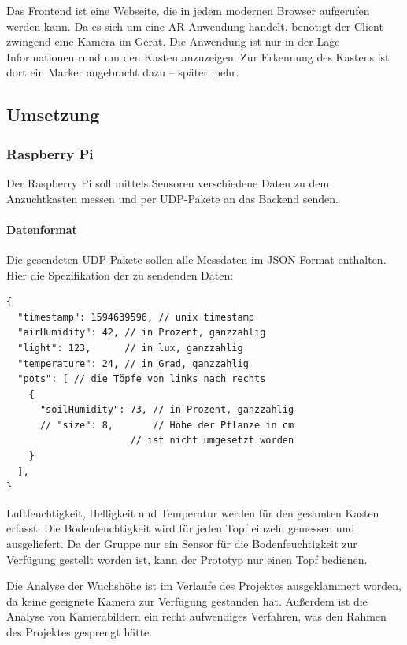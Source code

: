 Das Frontend ist eine Webseite, die in jedem modernen Browser aufgerufen
werden kann. Da es sich um eine AR-Anwendung handelt, benötigt der
Client zwingend eine Kamera im Gerät. Die Anwendung ist nur in der Lage
Informationen rund um den Kasten anzuzeigen. Zur Erkennung des Kastens
ist dort ein Marker angebracht dazu -- später mehr.

\hypertarget{umsetzung}{%
\subsection{Umsetzung}\label{umsetzung}}

\hypertarget{raspberry-pi}{%
\subsubsection{Raspberry Pi}\label{raspberry-pi}}

Der Raspberry Pi soll mittels Sensoren verschiedene Daten zu dem
Anzuchtkasten messen und per UDP-Pakete an das Backend senden.

\hypertarget{datenformat}{%
\paragraph{Datenformat}\label{datenformat}}

Die gesendeten UDP-Pakete sollen alle Messdaten im JSON-Format
enthalten. Hier die Spezifikation der zu sendenden Daten:

\begin{verbatim}
{
  "timestamp": 1594639596, // unix timestamp
  "airHumidity": 42, // in Prozent, ganzzahlig
  "light": 123,      // in lux, ganzzahlig
  "temperature": 24, // in Grad, ganzzahlig
  "pots": [ // die Töpfe von links nach rechts
    {
      "soilHumidity": 73, // in Prozent, ganzzahlig
      // "size": 8,       // Höhe der Pflanze in cm
                      // ist nicht umgesetzt worden
    }
  ],
}
\end{verbatim}

Luftfeuchtigkeit, Helligkeit und Temperatur werden für den gesamten
Kasten erfasst. Die Bodenfeuchtigkeit wird für jeden Topf einzeln
gemessen und ausgeliefert. Da der Gruppe nur ein Sensor für die
Bodenfeuchtigkeit zur Verfügung gestellt worden ist, kann der Prototyp
nur einen Topf bedienen.

Die Analyse der Wuchshöhe ist im Verlaufe des Projektes ausgeklammert
worden, da keine geeignete Kamera zur Verfügung gestanden hat. Außerdem
ist die Analyse von Kamerabildern ein recht aufwendiges Verfahren, was
den Rahmen des Projektes gesprengt hätte.

